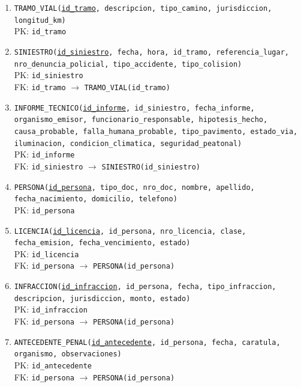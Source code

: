 \documentclass[12pt,a4paper]{article}
\begin{document}
\begin{enumerate}[leftmargin=*]
    \item \texttt{TRAMO\_VIAL(\underline{id\_tramo}, descripcion, tipo\_camino, jurisdiccion, longitud\_km)}\\
    PK: \texttt{id\_tramo}

    \item \texttt{SINIESTRO(\underline{id\_siniestro}, fecha, hora, id\_tramo, referencia\_lugar, nro\_denuncia\_policial, tipo\_accidente, tipo\_colision)}\\
    PK: \texttt{id\_siniestro}\\
    FK: \texttt{id\_tramo} $\rightarrow$ \texttt{TRAMO\_VIAL(id\_tramo)}

    \item \texttt{INFORME\_TECNICO(\underline{id\_informe}, id\_siniestro, fecha\_informe, organismo\_emisor, funcionario\_responsable, hipotesis\_hecho, causa\_probable, falla\_humana\_probable, tipo\_pavimento, estado\_via, iluminacion, condicion\_climatica, seguridad\_peatonal)}\\
    PK: \texttt{id\_informe}\\
    FK: \texttt{id\_siniestro} $\rightarrow$ \texttt{SINIESTRO(id\_siniestro)}

    \item \texttt{PERSONA(\underline{id\_persona}, tipo\_doc, nro\_doc, nombre, apellido, fecha\_nacimiento, domicilio, telefono)}\\
    PK: \texttt{id\_persona}

    \item \texttt{LICENCIA(\underline{id\_licencia}, id\_persona, nro\_licencia, clase, fecha\_emision, fecha\_vencimiento, estado)}\\
    PK: \texttt{id\_licencia}\\
    FK: \texttt{id\_persona} $\rightarrow$ \texttt{PERSONA(id\_persona)}

    \item \texttt{INFRACCION(\underline{id\_infraccion}, id\_persona, fecha, tipo\_infraccion, descripcion, jurisdiccion, monto, estado)}\\
    PK: \texttt{id\_infraccion}\\
    FK: \texttt{id\_persona} $\rightarrow$ \texttt{PERSONA(id\_persona)}

    \item \texttt{ANTECEDENTE\_PENAL(\underline{id\_antecedente}, id\_persona, fecha, caratula, organismo, observaciones)}\\
    PK: \texttt{id\_antecedente}\\
    FK: \texttt{id\_persona} $\rightarrow$ \texttt{PERSONA(id\_persona)}


\end{enumerate}
\end{document}
